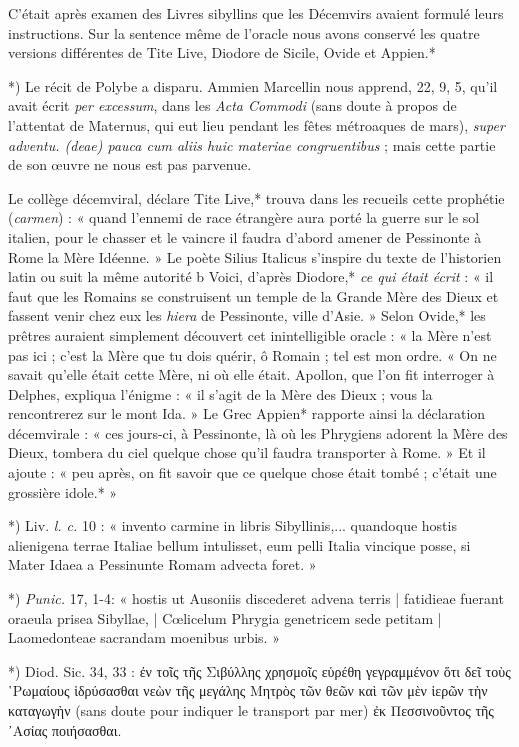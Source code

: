 \documentclass[a4paper, 11pt, oneside, polutonikogreek, french]{article}
\begin{document}
C'était après examen des Livres sibyllins que les Décemvirs avaient formulé leurs instructions. Sur la sentence même de l'oracle nous avons conservé les quatre versions différentes de Tite Live, Diodore de Sicile, Ovide et Appien.*

*) Le récit de Polybe a disparu. Ammien Marcellin nous apprend, 22, 9, 5, qu'il avait écrit \emph{per excessum}, dans les \emph{Acta Commodi} (sans doute à propos de l'attentat de Maternus, qui eut lieu pendant les fêtes métroaques de mars), \emph{super adventu. (deae) pauca cum aliis huic materiae congruentibus} ; mais cette partie de son œuvre ne nous est pas parvenue.

Le collège décemviral, déclare Tite Live,* trouva dans les recueils cette prophétie (\emph{carmen}) : « quand l'ennemi de race étrangère aura porté la guerre sur le sol italien, pour le chasser et le vaincre il faudra d'abord amener de Pessinonte à Rome la Mère Idéenne. » Le poète Silius Italicus s'inspire du texte de l'historien latin ou suit la même autorité b Voici, d'après Diodore,* \emph{ce qui était écrit} : « il faut que les Romains se construisent un temple de la Grande Mère des Dieux et fassent venir chez eux les \emph{hiera} de Pessinonte, ville d'Asie. » Selon Ovide,* les prêtres auraient simplement découvert cet inintelligible oracle : « la Mère n'est pas ici ; c'est la Mère que tu dois quérir, ô Romain ; tel est mon ordre. « On ne savait qu'elle était cette Mère, ni où elle était. Apollon, que l'on fit interroger à Delphes, expliqua l'énigme : « il s'agit de la Mère des Dieux ; vous la rencontrerez sur le mont Ida. » Le Grec Appien* rapporte ainsi la déclaration décemvirale : « ces jours-ci, à Pessinonte, là où les Phrygiens adorent la Mère des Dieux, tombera du ciel quelque chose qu'il faudra transporter à Rome. » Et il ajoute : « peu après, on fit savoir que ce quelque chose était tombé ; c'était une grossière idole.* »

*) Liv. \emph{l. c.} 10 : « invento carmine in libris Sibyllinis,... quandoque hostis alienigena terrae Italiae bellum intulisset, eum pelli Italia vincique posse, si Mater Idaea a Pessinunte Romam advecta foret. »

*) \emph{Punic.} 17, 1-4: « hostis ut Ausoniis discederet advena terris | fatidieae fuerant oraeula prisea Sibyllae, | Cœlicelum Phrygia genetricem sede petitam | Laomedonteae sacrandam moenibus urbis. »

*) Diod. Sic. 34, 33 : ἐν τοῖς τῆς Σιβύλλης χρησμοῖς εὑρέθη γεγραμμένον ὅτι δεῖ τοὺς ῾Ρωμαίους ἱδρύσασθαι νεὼν τῆς μεγάλης Μητρὸς τῶν θεῶν καὶ τῶν μὲν ἱερῶν τὴν καταγωγὴν (sans doute pour indiquer le transport par mer) ἐκ Πεσσινοῦντος τῆς ᾿Ασίας ποιήσασθαι.
\end{document}
